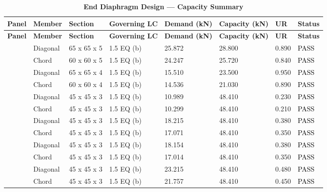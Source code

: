 \documentclass[12pt,a4paper]{report}
\numberwithin{table}{chapter}
\numberwithin{figure}{chapter}
\begin{document}
\begin{longtable}{|C{2.0cm}|L{1.8cm}|C{2.2cm}|C{3.0cm}|C{1.8cm}|C{1.8cm}|C{1.2cm}|C{1.8cm}|}
\caption{\textbf{End Diaphragm Design --- Capacity Summary}}\\
\hline
\textbf{Panel} & \textbf{Member} & \textbf{Section} & \textbf{Governing LC} & \textbf{Demand (kN)} & \textbf{Capacity (kN)} & \textbf{UR} & \textbf{Status} \\[6pt]
\hline
\endfirsthead
\hline
\textbf{Panel} & \textbf{Member} & \textbf{Section} & \textbf{Governing LC} & \textbf{Demand (kN)} & \textbf{Capacity (kN)} & \textbf{UR} & \textbf{Status} \\[6pt]
\hline
\endhead
{} & Diagonal & 65 x 65 x 5 & 1.5 EQ (b) & 25.872 & 28.800 & 0.890 & \textcolor{black}{PASS} \\[6pt]
 & Chord & 60 x 60 x 5 & 1.5 EQ (b) & 24.247 & 25.720 & 0.840 & \textcolor{black}{PASS} \\[6pt]
\hline
{} & Diagonal & 65 x 65 x 4 & 1.5 EQ (b) & 15.510 & 23.500 & 0.950 & \textcolor{black}{PASS} \\[6pt]
 & Chord & 60 x 60 x 4 & 1.5 EQ (b) & 14.536 & 21.030 & 0.890 & \textcolor{black}{PASS} \\[6pt]
\hline
{} & Diagonal & 45 x 45 x 3 & 1.5 EQ (b) & 10.989 & 48.410 & 0.230 & \textcolor{black}{PASS} \\[6pt]
 & Chord & 45 x 45 x 3 & 1.5 EQ (b) & 10.299 & 48.410 & 0.210 & \textcolor{black}{PASS} \\[6pt]
\hline
{} & Diagonal & 45 x 45 x 3 & 1.5 EQ (b) & 18.215 & 48.410 & 0.380 & \textcolor{black}{PASS} \\[6pt]
 & Chord & 45 x 45 x 3 & 1.5 EQ (b) & 17.071 & 48.410 & 0.350 & \textcolor{black}{PASS} \\[6pt]
\hline
{} & Diagonal & 45 x 45 x 3 & 1.5 EQ (b) & 18.154 & 48.410 & 0.380 & \textcolor{black}{PASS} \\[6pt]
 & Chord & 45 x 45 x 3 & 1.5 EQ (b) & 17.014 & 48.410 & 0.350 & \textcolor{black}{PASS} \\[6pt]
\hline
{} & Diagonal & 45 x 45 x 3 & 1.5 EQ (b) & 23.215 & 48.410 & 0.480 & \textcolor{black}{PASS} \\[6pt]
 & Chord & 45 x 45 x 3 & 1.5 EQ (b) & 21.757 & 48.410 & 0.450 & \textcolor{black}{PASS} \\[6pt]

\end{longtable}
\end{document}
